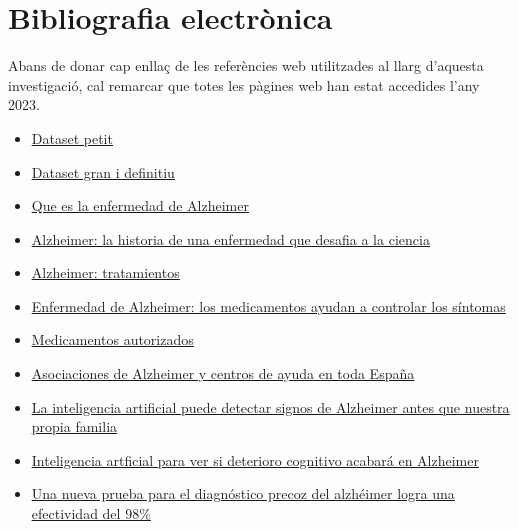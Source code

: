 \documentclass[a4paper,12pt]{report}
\begin{document}
\chapter*{Bibliografia electrònica}
Abans de donar cap enllaç de les referències web utilitzades al llarg d'aquesta investigació, cal remarcar que totes les pàgines web han estat accedides l'any 2023.
\begin{itemize}
\item \href{https://www.kaggle.com/datasets/legendahmed/alzheimermridataset}{\underline{Dataset petit}}
    \item \href{https://www.kaggle.com/datasets/uraninjo/augmented-alzheimer-mri-dataset?resource=download}{\underline{Dataset gran i definitiu}}
    \item \href{https://www.alz.org/alzheimer-demencia/que-es-la-enfermedad-de-alzheimer }{\underline{Que es la enfermedad de Alzheimer}}
    \item \href{https://www.caeme.org.ar/alzheimer-la-historia-de-una-enfermedad-que-desafia-a-la-ciencia/}{\underline{Alzheimer: la historia de una enfermedad que desafia a la ciencia }}
    \item \href{https://www.alz.org/alzheimer-demencia/tratamientos}{\underline{Alzheimer: tratamientos}}
    \item \href{https://www.mayoclinic.org/es-es/diseases-conditions/alzheimers-disease/in-depth/alzheimers/art-20048103}{\underline{Enfermedad de Alzheimer: los medicamentos ayudan a controlar los síntomas}}
    \item \href{http://www.alzfae.org/fundacion/549/medicamentos-autorizados}{\underline{Medicamentos autorizados}}
    \item \href{https://aiudo.es/asociaciones-de-alzheimer-y-centros/#asociaciones-de-alzheimer}{\underline{Asociaciones de Alzheimer y centros de ayuda en toda España}}
    \item \href{https://www.aecoc.es/innovation-hub-noticias/la-inteligencia-artificial-puede-detectar-signos-de-alzheimer-antes-que-nuestra-propia-familia/}{\underline{La inteligencia artificial puede detectar signos de Alzheimer antes que nuestra propia familia}}
    \item \href{https://www.lavanguardia.com/vida/20220427/8225520/inteligencia-artificial-ver-deterioro-cognitivo-acabara-alzheimer.html}{\underline{Inteligencia artficial para ver si deterioro cognitivo acabará en Alzheimer}}
    \item \href{https://www.larazon.es/sociedad/20220620/ajwe2fywxzgnta7zt4godk4bae.html}{\underline{Una nueva prueba para el diagnóstico precoz del alzhéimer logra una efectividad del 98\%}}

\end{itemize}
\end{document}
